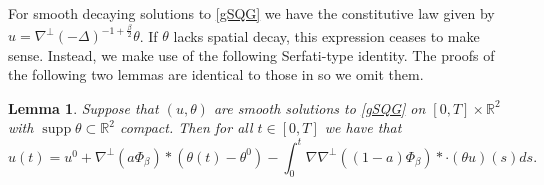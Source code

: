 \documentclass[12pt,xcolor=svgnames]{amsart}
\newtheorem{lemma}[theorem]{Lemma}
\newcommand{\R}{\mathbb{R}}
\DeclareMathOperator\supp{supp}
\begin{document}
For smooth decaying solutions to \eqref{gSQG} we have the constitutive law given by $u=\nabla^{\perp}(-\Delta)^{-1+\frac{\beta}{2}}\theta$. If $\theta$ lacks spatial decay, this expression ceases to  make sense. Instead, we make use of the following Serfati-type identity. The proofs of the following two lemmas are identical to those in \cite{1} so we omit them.
\begin{lemma}
\label{Serfati Identity}
Suppose that $(u,\theta)$ are smooth solutions to \eqref{gSQG} on $[0,T]\times\R^2$ with $\supp{\theta}\subset \R^2$ compact. Then for all $t \in [0,T]$ we have that
$$
u(t)=u^0 + \nabla^{\perp}(a\Phi_{\beta})\ast (\theta(t)-\theta^0) - \int_0^t \nabla \nabla^{\perp}((1-a)\Phi_{\beta})\ast\cdot (\theta u)(s)ds.
$$
\end{lemma}
$$
$$
\end{document}
